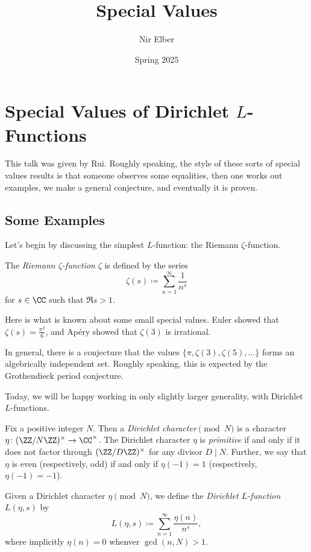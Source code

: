 \documentclass{article}
\title{Special Values}
\author{Nir Elber}
\date{Spring 2025}
\begin{document}
\maketitle

\tableofcontents

\section{Special Values of Dirichlet \texorpdfstring{$L$}{L}-Functions}
This talk was given by Rui. Roughly speaking, the style of these sorts of special values results is that someone observes some equalities, then one works out examples, we make a general conjecture, and eventually it is proven.

\subsection{Some Examples}
Let's begin by discussing the simplest $L$-function: the Riemann $\zeta$-function.
\begin{definition}
	The \textit{Riemann $\zeta$-function} $\zeta$ is defined by the series
	\[\zeta(s)\coloneqq\sum_{n=1}^\infty\frac1{n^s}\]
	for $s\in\CC$ such that $\Re s>1$.
\end{definition}
\begin{example}
	Here is what is known about some small special values. Euler showed that $\zeta(s)=\frac{\pi^2}6$, and Ap\'ery showed that $\zeta(3)$ is irrational.
\end{example}
\begin{remark}
	In general, there is a conjecture that the values $\{\pi,\zeta(3),\zeta(5),\ldots\}$ forms an algebrically independent set. Roughly speaking, this is expected by the Grothendieck period conjecture.
\end{remark}
Today, we will be happy working in only slightly larger generality, with Dirichlet $L$-functions.
\begin{definition}
	Fix a positive integer $N$. Then a \textit{Dirichlet character$\pmod N$} is a character $\eta\colon(\ZZ/N\ZZ)^\times\to\CC^\times$. The Dirichlet character $\eta$ is \textit{primitive} if and only if it does not factor through $(\ZZ/D\ZZ)^\times$ for any divisor $D\mid N$. Further, we say that $\eta$ is even (respectively, odd) if and only if $\eta(-1)=1$ (respectively, $\eta(-1)=-1$).
\end{definition}
\begin{definition}
	Given a Dirichlet character $\eta\pmod N$, we define the \textit{Dirichlet $L$-function} $L(\eta,s)$ by
	\[L(\eta,s)\coloneqq\sum_{n=1}^\infty\frac{\eta(n)}{n^s},\]
	where implicitly $\eta(n)=0$ whenver $\gcd(n,N)>1$.
\end{definition}
\end{document}
